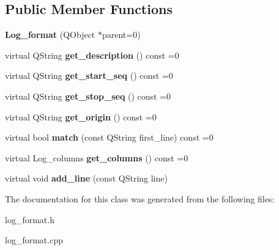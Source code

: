 \subsection*{Public Member Functions}
\begin{DoxyCompactItemize}
\item 
\hypertarget{class_log__viewer_1_1_log__format_aff06d1d34615bb6dc78a9f60f0800c90}{{\bfseries Log\-\_\-format} (Q\-Object $\ast$parent=0)}\label{class_log__viewer_1_1_log__format_aff06d1d34615bb6dc78a9f60f0800c90}

\item 
\hypertarget{class_log__viewer_1_1_log__format_a3bd09d2462e25b91ebb881d59220c49f}{virtual Q\-String {\bfseries get\-\_\-description} () const =0}\label{class_log__viewer_1_1_log__format_a3bd09d2462e25b91ebb881d59220c49f}

\item 
\hypertarget{class_log__viewer_1_1_log__format_a40d9e1b2a2ab55338060b16fa3979869}{virtual Q\-String {\bfseries get\-\_\-start\-\_\-seq} () const =0}\label{class_log__viewer_1_1_log__format_a40d9e1b2a2ab55338060b16fa3979869}

\item 
\hypertarget{class_log__viewer_1_1_log__format_a5f446a4324a53f918d726a727196d68b}{virtual Q\-String {\bfseries get\-\_\-stop\-\_\-seq} () const =0}\label{class_log__viewer_1_1_log__format_a5f446a4324a53f918d726a727196d68b}

\item 
\hypertarget{class_log__viewer_1_1_log__format_af939ec33a9759e25f56370fdb2a51e0b}{virtual Q\-String {\bfseries get\-\_\-origin} () const =0}\label{class_log__viewer_1_1_log__format_af939ec33a9759e25f56370fdb2a51e0b}

\item 
\hypertarget{class_log__viewer_1_1_log__format_a13dfc251301e3780f5427ed9f628a573}{virtual bool {\bfseries match} (const Q\-String first\-\_\-line) const =0}\label{class_log__viewer_1_1_log__format_a13dfc251301e3780f5427ed9f628a573}

\item 
\hypertarget{class_log__viewer_1_1_log__format_a58a93549369eb680aad0075d705c8c62}{virtual Log\-\_\-columns {\bfseries get\-\_\-columns} () const =0}\label{class_log__viewer_1_1_log__format_a58a93549369eb680aad0075d705c8c62}

\item 
\hypertarget{class_log__viewer_1_1_log__format_af2697cec3901d17a23d9107c4fd01ada}{virtual void {\bfseries add\-\_\-line} (const Q\-String line)}\label{class_log__viewer_1_1_log__format_af2697cec3901d17a23d9107c4fd01ada}

\end{DoxyCompactItemize}


The documentation for this class was generated from the following files\-:\begin{DoxyCompactItemize}
\item 
log\-\_\-format.\-h\item 
log\-\_\-format.\-cpp\end{DoxyCompactItemize}
